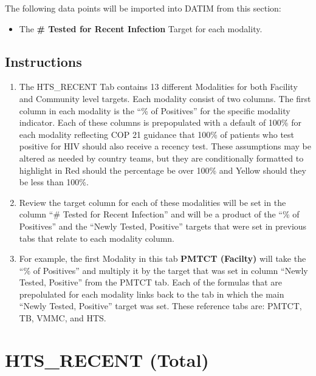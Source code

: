 \documentclass[
  openany]{book}
\providecommand{\tightlist}{%
  \setlength{\itemsep}{0pt}\setlength{\parskip}{0pt}}
\begin{document}
The following data points will be imported into DATIM from this section:

\begin{itemize}
\tightlist
\item
  The \textbf{\# Tested for Recent Infection} Target for each modality.
\end{itemize}

\hypertarget{instructions-31}{%
\subsection{Instructions}\label{instructions-31}}

\begin{enumerate}
\def\labelenumi{\arabic{enumi}.}
\item
  The HTS\_RECENT Tab contains 13 different Modalities for both
  Facility and Community level targets. Each modality consist of two
  columns. The first column in each modality is the ``\% of Positives''
  for the specific modality indicator. Each of these columns is
  prepopulated with a default of 100\% for each modality reflecting COP
  21 guidance that 100\% of patients who test positive for HIV should
  also receive a recency test. These assumptions may be altered as
  needed by country teams, but they are conditionally formatted to
  highlight in Red should the percentage be over 100\% and Yellow
  should they be less than 100\%.
\item
  Review the target column for each of these modalities will be set in
  the column ``\# Tested for Recent Infection'' and will be a product of
  the ``\% of Positives'' and the ``Newly Tested, Positive'' targets that
  were set in previous tabs that relate to each modality column.
\item
  For example, the first Modality in this tab \textbf{PMTCT (Facilty)} will
  take the ``\% of Positives'' and multiply it by the target that was set
  in column ``Newly Tested, Positive'' from the PMTCT tab. Each of the
  formulas that are prepolulated for each modality links back to the
  tab in which the main ``Newly Tested, Positive'' target was set. These
  reference tabs are: PMTCT, TB, VMMC, and HTS.
\end{enumerate}

\hypertarget{hts_recent-total}{%
\section{HTS\_RECENT (Total)}\label{hts_recent-total}}
\end{document}
